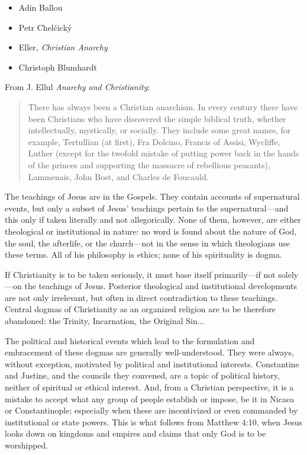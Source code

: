 \documentclass[a4paper, 12pt]{article}
\begin{document}
\begin{itemize}
    \item Adin Ballou 
    \item Petr Chelčický
    \item Eller, \textit{Christian Anarchy}
    \item Christoph Blumhardt
\end{itemize}

From J. Ellul \textit{Anarchy and Christianity}:

\begin{quote}
There has always been a Christian anarchism. In every century there have been
Christians who have discovered the simple biblical truth, whether
intellectually, mystically, or socially. They include some great names, for
example, Tertullian (at first), Fra Dolcino, Francis of Assisi, Wycliffe, Luther
(except for the twofold mistake of putting power back in the hands of the
princes and supporting the massacre of rebellious peasants), Lammenais, John
Bost, and Charles de Foucauld.
\end{quote}

\newpage

The teachings of Jesus are in the Gospels. They contain accounts of supernatural
events, but only a subset of Jesus' teachings pertain to the supernatural---and
this only if taken literally and not allegorically. None of them, however, are
either theological or institutional in nature: no word is found about the nature
of God, the soul, the afterlife, or the church---not in the sense in which
theologians use these terms. All of his philosophy is ethics; none of his
spirituality is dogma.

If Christianity is to be taken seriously, it must base itself primarily---if not
solely---on the teachings of Jesus. Posterior theological and institutional
developments are not only irrelevant, but often in direct contradiction to these
teachings. Central dogmas of Christianity as an organized religion are to be
therefore abandoned: the Trinity, Incarnation, the Original Sin... 

The political and historical events which lead to the formulation and
embracement of these dogmas are generally well-understood. They were always,
without exception, motivated by political and institutional interests.
Constantine and Justine, and the councils they convened, are a topic of
political history, neither of spiritual or ethical interest. And, from a
Christian perspective, it is a mistake to accept what any group of people
establish or impose, be it in Nicaea or Constantinople; especially when these
are incentivized or even commanded by institutional or state powers. This is
what follows from Matthew 4:10, when Jesus looks down on kingdoms and empires
and claims that only God is to be worshipped.
\end{document}
